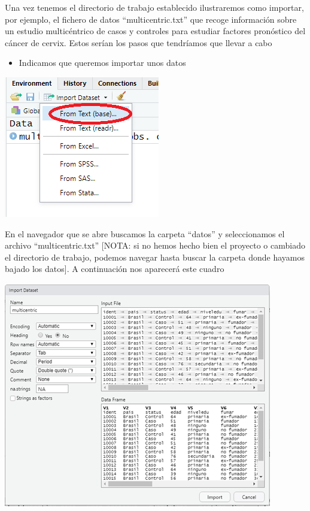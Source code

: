 \documentclass[
]{book}
\providecommand{\tightlist}{%
  \setlength{\itemsep}{0pt}\setlength{\parskip}{0pt}}
\begin{document}
Una vez tenemos el directorio de trabajo establecido ilustraremos como importar, por ejemplo, el fichero de datos ``multicentric.txt'' que recoge información sobre un estudio multicéntrico de casos y controles para estudiar factores pronóstico del cáncer de cervix. Estos serían los pasos que tendríamos que llevar a cabo

\begin{itemize}
\tightlist
\item
  Indicamos que queremos importar unos datos
\end{itemize}

\includegraphics{figures/load_data_1.png}

En el navegador que se abre buscamos la carpeta ``datos'' y seleccionamos el archivo ``multicentric.txt'' {[}NOTA: si no hemos hecho bien el proyecto o cambiado el directorio de trabajo, podemos navegar hasta buscar la carpeta donde hayamos bajado los datos{]}. A continuación nos aparecerá este cuadro

\includegraphics{figures/load_data_2.png}
\end{document}
